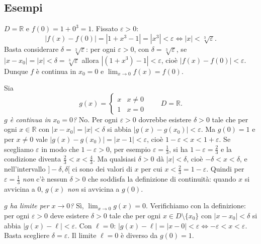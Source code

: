 \documentclass[11pt,a4paper]{article}
\begin{document}
\subsection{Esempi}

\begin{esempio}[$f(x) = 1 + x^3$ è continua in $x_0 = 0$]
$D = \mathbb{R}$ e $f(0) = 1 + 0^3 = 1$. Fissato $\varepsilon > 0$:
\[
|f(x) - f(0)| = |1 + x^3 - 1| = |x^3| < \varepsilon \iff |x| < \sqrt[3]{\varepsilon} .
\]
Basta considerare $\delta = \sqrt[3]{\varepsilon}$: per ogni $\varepsilon > 0$, con $\delta = \sqrt[3]{\varepsilon}$, se $|x - x_0| = |x| < \delta = \sqrt[3]{\varepsilon}$ allora $|(1 + x^3) - 1| < \varepsilon$, cioè $|f(x) - f(0)| < \varepsilon$. Dunque $f$ è continua in $x_0 = 0$ e $\lim_{x \to 0} f(x) = f(0)$.
\end{esempio}

\begin{esempio}
Sia
\[
g(x) = \begin{cases} x & x \neq 0 \\ 1 & x = 0 \end{cases}
\qquad D = \mathbb{R} .
\]
\emph{$g$ è continua in $x_0 = 0$?} No. Per ogni $\varepsilon > 0$ dovrebbe esistere $\delta > 0$ tale che per ogni $x \in \mathbb{R}$ con $|x - x_0| = |x| < \delta$ si abbia $|g(x) - g(x_0)| < \varepsilon$. Ma $g(0) = 1$ e per $x \ne 0$ vale $|g(x) - g(x_0)| = |x - 1| < \varepsilon$, cioè $1 - \varepsilon < x < 1 + \varepsilon$. Se scegliamo $\varepsilon$ in modo che $1 - \varepsilon > 0$, per esempio $\varepsilon = \tfrac{1}{3}$, si ha $1 - \varepsilon = \tfrac{2}{3}$ e la condizione diventa $\tfrac{2}{3} < x < \tfrac{4}{3}$. Ma qualsiasi $\delta > 0$ dà $|x| < \delta$, cioè $-\delta < x < \delta$, e nell'intervallo $]-\delta, \delta[$ ci sono dei valori di $x$ per cui $x < \tfrac{2}{3} = 1 - \varepsilon$. Quindi per $\varepsilon = \tfrac{1}{3}$ \emph{non} c'è nessun $\delta > 0$ che soddisfa la definizione di continuità: quando $x$ si avvicina a $0$, $g(x)$ \emph{non} si avvicina a $g(0)$.

\emph{$g$ ha limite per $x \to 0$?} Sì, $\displaystyle\lim_{x\to 0} g(x) = 0$. Verifichiamo con la definizione: per ogni $\varepsilon > 0$ deve esistere $\delta > 0$ tale che per ogni $x \in D \setminus \{x_0\}$ con $|x - x_0| < \delta$ si abbia $|g(x) - \ell| < \varepsilon$. Con $\ell = 0$: $|g(x) - \ell| = |x - 0| < \varepsilon \iff -\varepsilon < x < \varepsilon$. Basta scegliere $\delta = \varepsilon$. Il limite $\ell = 0$ è diverso da $g(0) = 1$.
\end{esempio}
\end{document}
